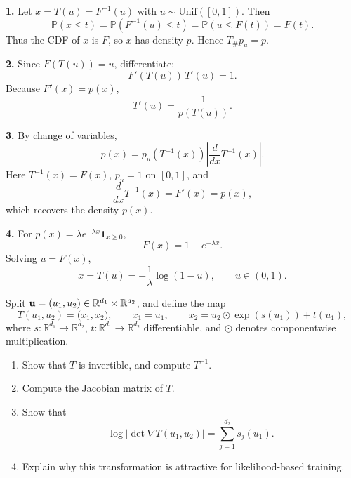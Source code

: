 \begin{solution}

\textbf{1.} Let $x=T(u)=F^{-1}(u)$ with $u\sim \mathrm{Unif}([0,1])$. Then
\[
\mathbb{P}(x\le t)
= \mathbb{P}(F^{-1}(u)\le t)
= \mathbb{P}(u\le F(t))
= F(t).
\]
Thus the CDF of $x$ is $F$, so $x$ has density $p$. Hence $T_\# p_u = p$.

\medskip

\textbf{2.} Since $F(T(u))=u$, differentiate:
\[
F'(T(u))\,T'(u)=1.
\]
Because $F'(x)=p(x)$,
\[
T'(u)=\frac{1}{p(T(u))}.
\]

\medskip

\textbf{3.} By change of variables,
\[
p(x)=p_u(T^{-1}(x))\left|\frac{d}{dx}T^{-1}(x)\right|.
\]
Here $T^{-1}(x)=F(x)$, $p_u=1$ on $[0,1]$, and
\[
\frac{d}{dx}T^{-1}(x)=F'(x)=p(x),
\]
which recovers the density $p(x)$.

\medskip

\textbf{4.} For $p(x)=\lambda e^{-\lambda x}\mathbf{1}_{x\ge0}$,
\[
F(x)=1-e^{-\lambda x}.
\]
Solving $u=F(x)$,
\[
x=T(u)=-\frac{1}{\lambda}\log(1-u), \qquad u\in(0,1).
\]

\end{solution}


\begin{exercise}
Split \({ \mathbf{u}}=(u_1,u_2)\in\mathbb{R}^{d_1}\times\mathbb{R}^{d_2}\), and define the map
\[
T(u_1,u_2)=\bigl(x_1,x_2\bigr),\qquad
x_1=u_1,\qquad
x_2=u_2\odot \exp(s(u_1))+t(u_1),
\]
where \(s:\mathbb{R}^{d_1}\to\mathbb{R}^{d_2}\), \(t:\mathbb{R}^{d_1}\to\mathbb{R}^{d_2}\) differentiable, and \(\odot\) denotes componentwise multiplication.

\begin{enumerate}
\item Show that \(T\) is invertible, and compute \(T^{-1}\).
\item Compute the Jacobian matrix of \(T\).
\item Show that
\[
\log |\det \nabla T(u_1,u_2)| = \sum_{j=1}^{d_2} s_j(u_1).
\]
\item Explain why this transformation is attractive for likelihood-based training.
\end{enumerate}
\end{exercise}

